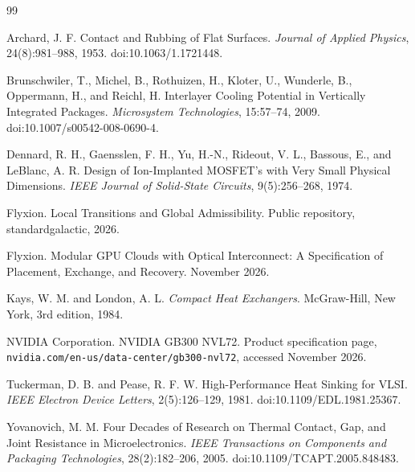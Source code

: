 \documentclass[11pt]{article}
\theoremstyle{definition}
\theoremstyle{plain}
\theoremstyle{remark}
\begin{document}
\begingroup
\small
\setlength{\itemsep}{0pt}
\begin{thebibliography}{99}

Archard, J. F.
\newblock Contact and Rubbing of Flat Surfaces.
\newblock \emph{Journal of Applied Physics}, 24(8):981--988, 1953.
\newblock doi:10.1063/1.1721448.

Brunschwiler, T., Michel, B., Rothuizen, H., Kloter, U., Wunderle, B., Oppermann, H., and Reichl, H.
\newblock Interlayer Cooling Potential in Vertically Integrated Packages.
\newblock \emph{Microsystem Technologies}, 15:57--74, 2009.
\newblock doi:10.1007/s00542-008-0690-4.

Dennard, R. H., Gaensslen, F. H., Yu, H.-N., Rideout, V. L., Bassous, E., and LeBlanc, A. R.
\newblock Design of Ion-Implanted MOSFET's with Very Small Physical Dimensions.
\newblock \emph{IEEE Journal of Solid-State Circuits}, 9(5):256--268, 1974.

Flyxion.
\newblock Local Transitions and Global Admissibility.
\newblock Public repository, standardgalactic, 2026.

Flyxion.
\newblock Modular GPU Clouds with Optical Interconnect: A Specification of Placement, Exchange, and Recovery.
\newblock November 2026.

Kays, W. M. and London, A. L.
\newblock \emph{Compact Heat Exchangers}.
\newblock McGraw-Hill, New York, 3rd edition, 1984.

NVIDIA Corporation.
\newblock NVIDIA GB300 NVL72.
\newblock Product specification page, \texttt{nvidia.com/en-us/data-center/gb300-nvl72}, accessed November 2026.

Tuckerman, D. B. and Pease, R. F. W.
\newblock High-Performance Heat Sinking for VLSI.
\newblock \emph{IEEE Electron Device Letters}, 2(5):126--129, 1981.
\newblock doi:10.1109/EDL.1981.25367.

Yovanovich, M. M.
\newblock Four Decades of Research on Thermal Contact, Gap, and Joint Resistance in Microelectronics.
\newblock \emph{IEEE Transactions on Components and Packaging Technologies}, 28(2):182--206, 2005.
\newblock doi:10.1109/TCAPT.2005.848483.

\end{thebibliography}
\endgroup
\end{document}
